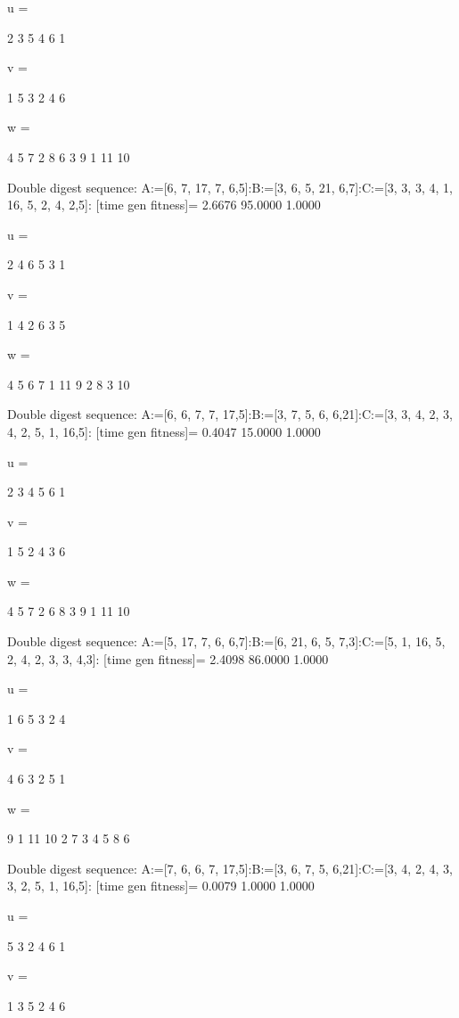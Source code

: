 u =

     2     3     5     4     6     1


v =

     1     5     3     2     4     6


w =

     4     5     7     2     8     6     3     9     1    11    10

Double digest sequence:
A:=[6, 7, 17, 7, 6,5]:B:=[3, 6, 5, 21, 6,7]:C:=[3, 3, 3, 4, 1, 16, 5, 2, 4, 2,5]:
[time gen fitness]=
    2.6676   95.0000    1.0000


u =

     2     4     6     5     3     1


v =

     1     4     2     6     3     5


w =

     4     5     6     7     1    11     9     2     8     3    10

Double digest sequence:
A:=[6, 6, 7, 7, 17,5]:B:=[3, 7, 5, 6, 6,21]:C:=[3, 3, 4, 2, 3, 4, 2, 5, 1, 16,5]:
[time gen fitness]=
    0.4047   15.0000    1.0000


u =

     2     3     4     5     6     1


v =

     1     5     2     4     3     6


w =

     4     5     7     2     6     8     3     9     1    11    10

Double digest sequence:
A:=[5, 17, 7, 6, 6,7]:B:=[6, 21, 6, 5, 7,3]:C:=[5, 1, 16, 5, 2, 4, 2, 3, 3, 4,3]:
[time gen fitness]=
    2.4098   86.0000    1.0000


u =

     1     6     5     3     2     4


v =

     4     6     3     2     5     1


w =

     9     1    11    10     2     7     3     4     5     8     6

Double digest sequence:
A:=[7, 6, 6, 7, 17,5]:B:=[3, 6, 7, 5, 6,21]:C:=[3, 4, 2, 4, 3, 3, 2, 5, 1, 16,5]:
[time gen fitness]=
    0.0079    1.0000    1.0000


u =

     5     3     2     4     6     1


v =

     1     3     5     2     4     6


